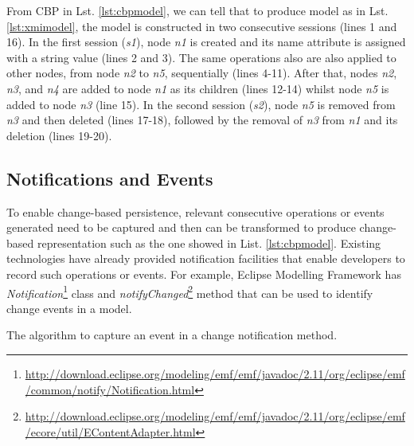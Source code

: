 \documentclass{llncs}
\begin{document}
From CBP in Lst. \ref{lst:cbpmodel}, we can tell that to produce model as in Lst. \ref{lst:xmimodel}, the model is constructed in two consecutive sessions (lines 1 and 16). In the first session (\emph{s1}), node \emph{n1} is created and its name attribute is assigned with a string value (lines 2 and 3). The same operations also are also applied to other nodes, from node \emph{n2} to \emph{n5}, sequentially (lines 4-11). After that, nodes \emph{n2}, \emph{n3}, and \emph{n4} are added to node \emph{n1} as its children (lines 12-14) whilst node \emph{n5} is added to node \emph{n3} (line 15). In the second session (\emph{s2}), node \emph{n5} is removed from \emph{n3} and then deleted (lines 17-18), followed by the removal of \emph{n3} from \emph{n1} and its deletion (lines 19-20).

\subsection{Notifications and Events}
\label{sec:notifications_and_events}
To enable change-based persistence, relevant consecutive operations or events generated need to be captured and then can be transformed to produce change-based representation such as the one showed in List. \ref{lst:cbpmodel}. Existing technologies have already provided notification facilities that enable developers to record such operations or events. For example, Eclipse Modelling Framework has \emph{Notification}\footnote{\url{http://download.eclipse.org/modeling/emf/emf/javadoc/2.11/org/eclipse/emf/common/notify/Notification.html}} class and \emph{notifyChanged}\footnote{\url{http://download.eclipse.org/modeling/emf/emf/javadoc/2.11/org/eclipse/emf/ecore/util/EContentAdapter.html}} method that can be used to identify change events in a model. 

\begin{algorithm}
\begin{small}
\end{small}
\caption{The algorithm to capture an event in a change notification method.}
\label{alg:capture_events}
\end{algorithm}
\end{document}
